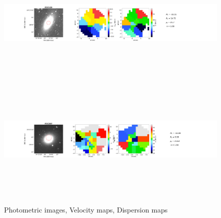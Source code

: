 \documentclass{aa}
\begin{document}
\begin{figure}[!htb]
   \includegraphics[width=21cm,height=6cm,keepaspectratio]{../2_pipeline/1_V&S_Maps/135Velocity_map.pdf}
   \includegraphics[width=21cm,height=6cm,keepaspectratio]{../2_pipeline/1_V&S_Maps/207Velocity_map.pdf}
         \caption{Photometric images, Velocity maps, Dispersion maps}
         \label{FigVelDis}
\end{figure}
\clearpage
%
\end{document}
